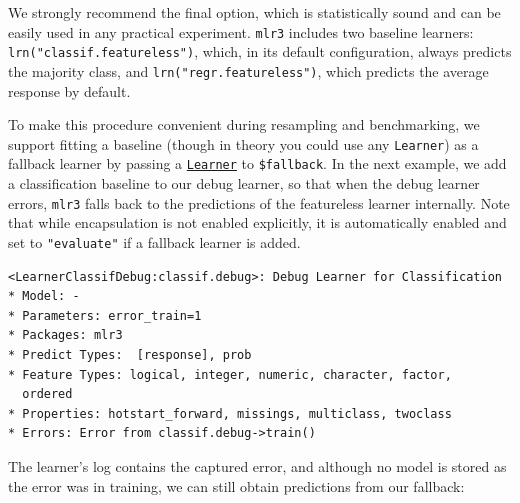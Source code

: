 We strongly recommend the final option, which is statistically sound and
can be easily used in any practical experiment. \texttt{mlr3} includes
two baseline learners: \texttt{lrn("classif.featureless")}, which, in
its default configuration, always predicts the majority class, and
\texttt{lrn("regr.featureless")}, which predicts the average response by
default.

To make this procedure convenient during resampling and benchmarking, we
support fitting a baseline (though in theory you could use any
\texttt{Learner}) as a fallback learner by
passing a
\href{https://mlr3.mlr-org.com/reference/Learner.html}{\texttt{Learner}}
to
\texttt{\$fallback}.
In the next example, we add a classification baseline to our debug
learner, so that when the debug learner errors, \texttt{mlr3} falls back
to the predictions of the featureless learner internally. Note that
while encapsulation is not enabled explicitly, it is automatically
enabled and set to \texttt{"evaluate"} if a fallback learner is added.

\begin{Shaded}
\begin{Highlighting}[]
\OtherTok{=} \NormalTok{(}\NormalTok{, } \NormalTok{)}
\SpecialCharTok{$}\OtherTok{=} \NormalTok{(}\NormalTok{)}

\SpecialCharTok{$}
\end{Highlighting}
\end{Shaded}

\begin{verbatim}
<LearnerClassifDebug:classif.debug>: Debug Learner for Classification
* Model: -
* Parameters: error_train=1
* Packages: mlr3
* Predict Types:  [response], prob
* Feature Types: logical, integer, numeric, character, factor,
  ordered
* Properties: hotstart_forward, missings, multiclass, twoclass
* Errors: Error from classif.debug->train()
\end{verbatim}

The learner's log contains the captured error, and although no model is
stored as the error was in training, we can still obtain predictions
from our fallback:

